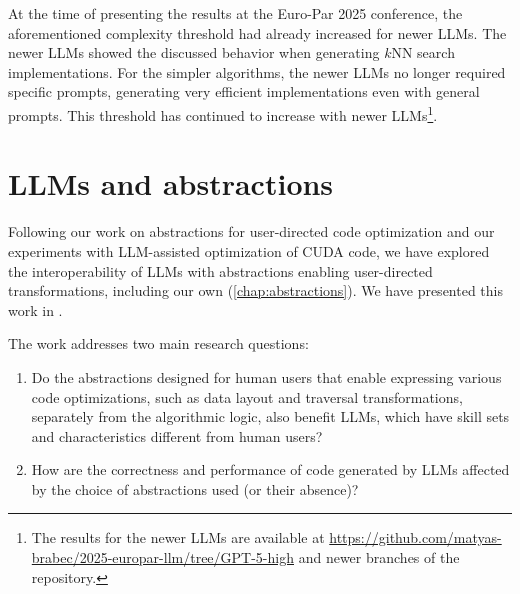 
At the time of presenting the results at the Euro-Par 2025 conference, the aforementioned complexity threshold had already increased for newer LLMs. The newer LLMs showed the discussed behavior when generating \(k\)NN search implementations. For the simpler algorithms, the newer LLMs no longer required specific prompts, generating very efficient implementations even with general prompts. This threshold has continued to increase with newer LLMs\footnote{The results for the newer LLMs are available at \url{https://github.com/matyas-brabec/2025-europar-llm/tree/GPT-5-high} and newer branches of the repository.}.


\section{LLMs and abstractions}\label{sec:llms-and-abstractions}

Following our work on abstractions for user-directed code optimization and our experiments with LLM-assisted optimization of CUDA code, we have explored the interoperability of LLMs with abstractions enabling user-directed transformations, including our own (\cref{chap:abstractions}). We have presented this work in .

\vspace{1em}%
\noindent%
The work addresses two main research questions:
\begin{enumerate}[(1)]
\item Do the abstractions designed for human users that enable expressing various code optimizations, such as data layout and traversal transformations, separately from the algorithmic logic, also benefit LLMs, which have skill sets and characteristics different from human users?
\item How are the correctness and performance of code generated by LLMs affected by the choice of abstractions used (or their absence)?
\end{enumerate}


